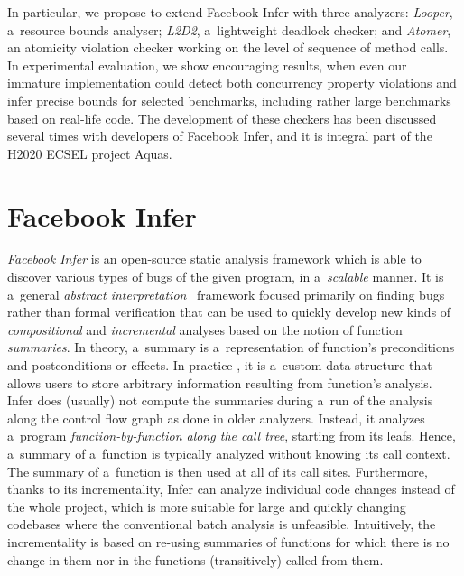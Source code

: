 \documentclass{ExcelAtFIT}
\begin{document}
In particular, we propose to extend Facebook Infer
with three analyzers: \emph{Looper}, a~resource
bounds analyser; \emph{L2D2}, a~lightweight
deadlock checker; and \emph{Atomer}, an atomicity
violation checker working on the level of sequence of
method calls. In experimental evaluation, we show
encouraging results, when even our immature
implementation could detect both concurrency
property violations and infer precise bounds for
selected benchmarks, including rather large
benchmarks based on real-life code. The development
of these checkers has been discussed several times
with developers of Facebook Infer, and it is integral
part of the H2020 ECSEL project Aquas.

\section{Facebook Infer}
\label{sec:infer}

\emph{Facebook Infer} is an open-source static
analysis framework which is able to discover
various types of bugs of the given program, in
a~\emph{scalable} manner. 
It is a~general \emph{abstract
interpretation}~\cite{CousotCousot77-1} framework
focused primarily on finding bugs rather than
formal verification that can be used to quickly
develop new kinds of \emph{compositional} and
\emph{incremental} analyses based on the notion
of function \emph{summaries}. In theory, a~summary
is a~representation of function's preconditions and
postconditions or effects. In practice , 
it is a~custom data structure that allows
users to store arbitrary information resulting
from function's analysis. Infer does (usually) not
compute the summaries during a~run of the analysis
along the control flow graph as done in older
analyzers. Instead, it analyzes a~program
\emph{function-by-function along the call tree}, starting
from its leafs. Hence, a~summary of a~function is
typically analyzed without knowing its call context.
The summary of a~function is
then used at all of its call sites. Furthermore,
thanks to its incrementality, Infer can analyze
individual code changes instead of the whole project,
which is more suitable for large and quickly changing
codebases where the conventional batch analysis is
unfeasible. Intuitively, the incrementality is based
on re-using summaries of functions for which there is
no change in them nor in the functions (transitively)
called from them.
\end{document}
